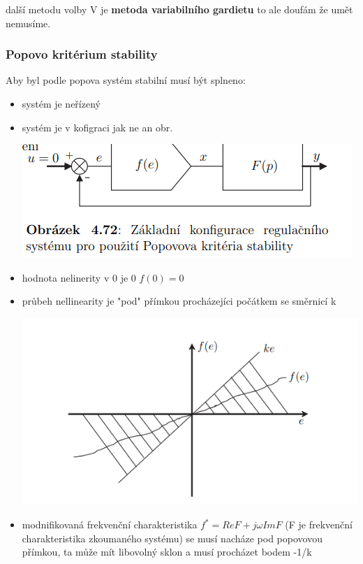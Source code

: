 další metodu volby V je {\bf metoda variabilního gardietu } to ale doufám že umět nemusíme.

\subsubsection{Popovo kritérium stability}
Aby byl podle popova systém stabilní musí být splneno:
\begin{itemize}
    \item systém je neřízený
    \item systém  je v kofigraci jak ne an obr.

        \includegraphics{img/popov.schem.png}
    \item hodnota nelinerity v 0 je 0 $f(0)=0$
    \item průbeh nellinearity je "pod" přímkou procházejíci počátkem se směrnicí k

        \includegraphics{img/popov_nelilin.png}
    \item modnifikovaná frekvenční charakteristika $f^*=Re{F}+j\omega Im{F}$ (F je frekvenční charakteristika zkoumaného systému) se musí nacháze pod popovovou přímkou,
    ta může mít libovolný sklon a musí procházet bodem -1/k


\end{itemize}

